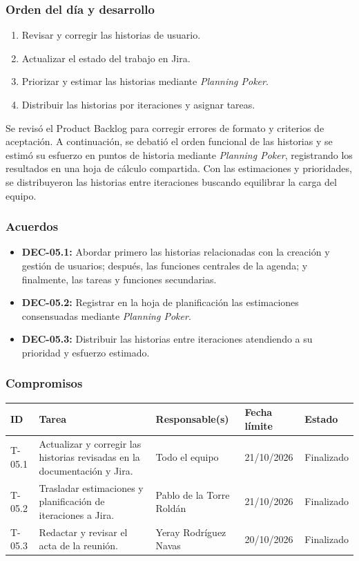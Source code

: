 \subsubsection{Orden del día y desarrollo}
\begin{enumerate}[leftmargin=*]
  \item Revisar y corregir las historias de usuario.
  \item Actualizar el estado del trabajo en Jira.
  \item Priorizar y estimar las historias mediante \textit{Planning Poker}.
  \item Distribuir las historias por iteraciones y asignar tareas.
\end{enumerate}
Se revisó el Product Backlog para corregir errores de formato y criterios de aceptación. A continuación, se debatió el orden funcional de las historias y se estimó su esfuerzo en puntos de historia mediante \textit{Planning Poker}, registrando los resultados en una hoja de cálculo compartida. Con las estimaciones y prioridades, se distribuyeron las historias entre iteraciones buscando equilibrar la carga del equipo.

\subsubsection{Acuerdos}
\begin{itemize}[leftmargin=*]
  \item \textbf{DEC-05.1:} Abordar primero las historias relacionadas con la creación y gestión de usuarios; después, las funciones centrales de la agenda; y finalmente, las tareas y funciones secundarias.
  \item \textbf{DEC-05.2:} Registrar en la hoja de planificación las estimaciones consensuadas mediante \textit{Planning Poker}.
  \item \textbf{DEC-05.3:} Distribuir las historias entre iteraciones atendiendo a su prioridad y esfuerzo estimado.
\end{itemize}

\subsubsection{Compromisos}
\begin{center}\footnotesize
\begin{tabularx}{\textwidth}{@{}p{}X p{}p{}p{}@{}}
\toprule
\rowcolor{tableHeader} ID & Tarea & Responsable(s) & Fecha límite & Estado \\
\midrule
T-05.1 & Actualizar y corregir las historias revisadas en la documentación y Jira. & Todo el equipo & 21/10/2026 & Finalizado \\
T-05.2 & Trasladar estimaciones y planificación de iteraciones a Jira. & Pablo de la Torre Roldán & 21/10/2026 & Finalizado \\
T-05.3 & Redactar y revisar el acta de la reunión. & Yeray Rodríguez Navas & 20/10/2026 & Finalizado \\
\bottomrule
\end{tabularx}
\end{center}

